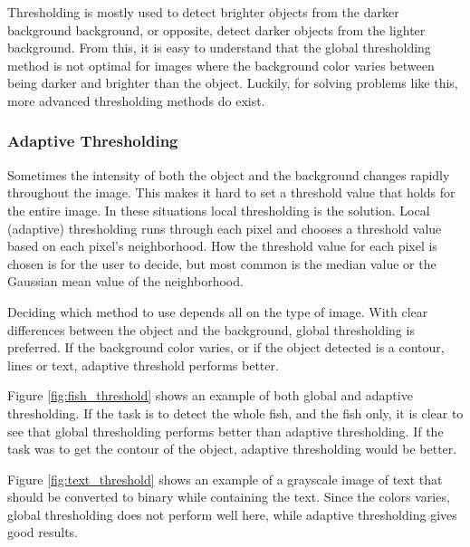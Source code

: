 Thresholding is mostly used to detect brighter objects from the darker background background, or opposite, detect darker objects from the lighter background.
From this, it is easy to understand that the global thresholding method is not optimal for images where the background color varies between being darker and brighter than the object.
Luckily, for solving problems like this, more advanced thresholding methods do exist.


\subsubsection{Adaptive Thresholding}
Sometimes the intensity of both the object and the background changes rapidly throughout the image. This makes it hard to set a threshold value that holds for the entire image. In these situations local thresholding is the solution. Local (adaptive) thresholding runs through each pixel and chooses a threshold value based on each pixel's neighborhood. How the threshold value for each pixel is chosen is for the user to decide, but most common is the median value or the Gaussian mean value of the neighborhood.

Deciding which method to use depends all on the type of image. With clear differences between the object and the background, global thresholding is preferred. If the background color varies, or if the object detected is a contour, lines or text, adaptive threshold performs better.
\newline

Figure \ref{fig:fish_threshold} shows an example of both global and adaptive thresholding. If the task is to detect the whole fish, and the fish only, it is clear to see that global thresholding performs better than adaptive thresholding. If the task was to get the contour of the object, adaptive thresholding would be better. 

Figure \ref{fig:text_threshold} shows an example of a grayscale image of text that should be converted to binary while containing the text. Since the colors varies, global thresholding does not perform well here, while adaptive thresholding gives good results.


